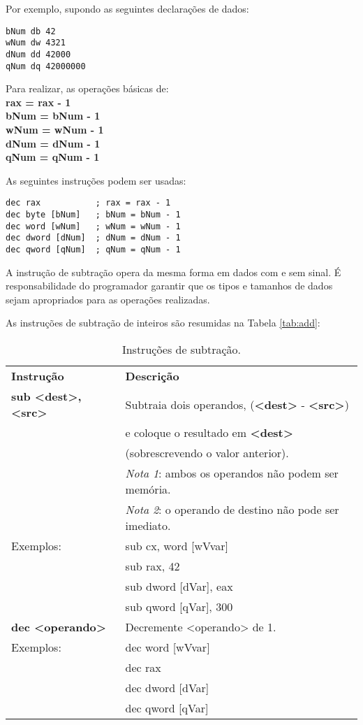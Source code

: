 Por exemplo, supondo as seguintes declarações de dados:
\begin{lstlisting}
bNum db 42
wNum dw 4321
dNum dd 42000
qNum dq 42000000
\end{lstlisting}

Para realizar, as operações básicas de:\\
\textbf{rax = rax - 1\\
	bNum = bNum - 1\\
	wNum = wNum - 1\\
	dNum = dNum - 1\\
	qNum = qNum - 1\\}

As seguintes instruções podem ser usadas:
\begin{lstlisting}
dec rax           ; rax = rax - 1
dec byte [bNum]   ; bNum = bNum - 1
dec word [wNum]   ; wNum = wNum - 1
dec dword [dNum]  ; dNum = dNum - 1
dec qword [qNum]  ; qNum = qNum - 1
\end{lstlisting}

A instrução de subtração opera da mesma forma em dados com e sem sinal. É responsabilidade do programador garantir que os tipos e tamanhos de dados sejam apropriados para as operações realizadas.

As instruções de subtração de inteiros são resumidas na Tabela \ref{tab:add}:

\begin{table}[ht]
	\begin{center}
		\begin{tabular}{|ll|}
			\hline
			\rowcolor[HTML]{C0C0C0}
			\textbf{Instrução} & \textbf{Descrição} \\ 
			\textbf{sub <dest>, <src>} & Subtraia dois operandos, (\textbf{<dest>} - \textbf{<src>})\\
			& e coloque o resultado em \textbf{<dest>}\\
			&(sobrescrevendo o valor anterior).\\
			& \textit{Nota 1}: ambos os operandos não podem ser memória.\\
			& \textit{Nota 2}: o operando de destino não pode ser imediato.\\
			Exemplos:& sub cx, word [wVvar]\\
			&sub rax, 42\\
			&sub dword [dVar], eax\\
			&sub qword [qVar], 300\\\hline
			\textbf{dec <operando>} &Decremente <operando> de 1.\\
			Exemplos:& dec word [wVvar]\\
			&dec rax\\
			&dec dword [dVar]\\
			&dec qword [qVar]\\ \hline			   	
		\end{tabular}%
	\end{center}
	\caption{Instruções de subtração.}
	\label{tab:sub}
\end{table}

